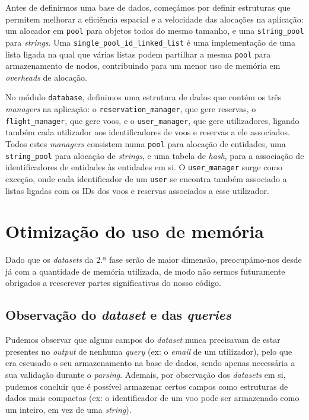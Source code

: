 \documentclass[12pt, a4paper]{article}
\begin{document}
Antes de definirmos uma base de dados, começámos por definir estruturas que permitem melhorar a
eficiência espacial e a velocidade das alocações na aplicação: um alocador em \texttt{pool} para
objetos todos do mesmo tamanho, e uma \texttt{string\_pool} para \emph{strings}. Uma
\texttt{single\_pool\_id\_linked\_list} é uma implementação de uma lista ligada na qual que várias
listas podem partilhar a mesma \texttt{pool} para armazenamento de nodos, contribuindo para um
menor uso de memória em \emph{overheads} de alocação.

No módulo \texttt{database}, definimos uma estrutura de dados que contém os três \emph{managers} na
aplicação: o \texttt{reservation\_manager}, que gere reservas, o \texttt{flight\_manager}, que gere
voos, e o \texttt{user\_manager}, que gere utilizadores, ligando também cada utilizador aos
identificadores de voos e reservas a ele associados. Todos estes \emph{managers} consistem numa
\texttt{pool} para alocação de entidades, uma \texttt{string\_pool} para alocação de \emph{strings},
e uma tabela de \emph{hash}, para a associação de identificadores de entidades às entidades em si.
O \texttt{user\_manager} surge como exceção, onde cada identificador de um \texttt{user} se
encontra também associado a listas ligadas com os IDs dos voos e reservas associados a esse
utilizador.







\section{Otimização do uso de memória}

Dado que os \emph{datasets} da 2.ª fase serão de maior dimensão, preocupámo-nos desde já com a
quantidade de memória utilizada, de modo não sermos futuramente obrigados a reescrever partes
significativas do nosso código.

\subsection{Observação do \emph{dataset} e das \emph{queries}}

Pudemos observar que alguns campos do \emph{dataset} nunca precisavam de estar presentes no
\emph{output} de nenhuma \emph{query} (ex: o \emph{email} de um utilizador), pelo que era escusado
o seu armazenamento na base de dados, sendo apenas necessária a sua validação durante o
\emph{parsing}. Ademais, por observação dos \emph{datasets} em si, pudemos concluir que é possível
armazenar certos campos como estruturas de dados mais compactas (ex: o identificador de um voo
pode ser armazenado como um inteiro, em vez de uma \emph{string}).
\end{document}
